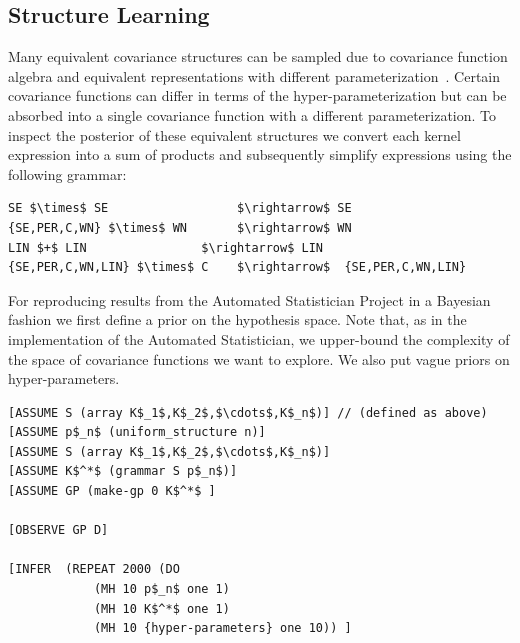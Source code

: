 \documentclass{article} %
\begin{document}
\subsection{Structure Learning}
Many equivalent covariance structures can be sampled due to covariance function algebra and equivalent representations with different parameterization~\citep{lloyd2014automatic}. Certain covariance functions can differ in terms of the hyper-parameterization but can be absorbed into a single covariance function with a different parameterization. To inspect the posterior of these equivalent structures we convert each kernel expression into a sum of products and subsequently simplify expressions using the following grammar:
\begin{minipage}{\linewidth}

\begin{lstlisting}[frame=single,label=alg:simplify,caption=Grammar to simplify expressions,mathescape]
SE $\times$ SE                  $\rightarrow$ SE 
{SE,PER,C,WN} $\times$ WN       $\rightarrow$ WN
LIN $+$ LIN                $\rightarrow$ LIN
{SE,PER,C,WN,LIN} $\times$ C    $\rightarrow$  {SE,PER,C,WN,LIN} 
\end{lstlisting}

\end{minipage}

For reproducing results from the Automated Statistician Project in a Bayesian fashion we first define a prior on the hypothesis space. Note that, as in the implementation of the Automated Statistician, we upper-bound the complexity of the space of covariance functions we want to explore. We also put vague priors on hyper-parameters.


\begin{minipage}{\linewidth}

\begin{lstlisting}[frame=single,label=alg:structureVent,caption=Venture Code for Bayesian GP Structure Learning,mathescape]
[ASSUME S (array K$_1$,K$_2$,$\cdots$,K$_n$)] // (defined as above)
[ASSUME p$_n$ (uniform_structure n)]
[ASSUME S (array K$_1$,K$_2$,$\cdots$,K$_n$)]
[ASSUME K$^*$ (grammar S p$_n$)]
[ASSUME GP (make-gp 0 K$^*$ ]

[OBSERVE GP D]

[INFER  (REPEAT 2000 (DO 
			(MH 10 p$_n$ one 1) 
			(MH 10 K$^*$ one 1) 
			(MH 10 {hyper-parameters} one 10)) ]


\end{lstlisting}

\end{minipage}
\end{document}
